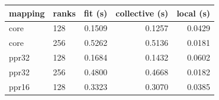 \begin{tabular}{llrrr}
\toprule
mapping & ranks & fit (s) & collective (s) & local (s)\\
\midrule
core & 128 & 0.1509 & 0.1257 & 0.0429\\
core & 256 & 0.5262 & 0.5136 & 0.0181\\
ppr32 & 128 & 0.1684 & 0.1432 & 0.0602\\
ppr32 & 256 & 0.4800 & 0.4668 & 0.0182\\
ppr16 & 128 & 0.3323 & 0.3070 & 0.0385\\
\bottomrule
\end{tabular}
